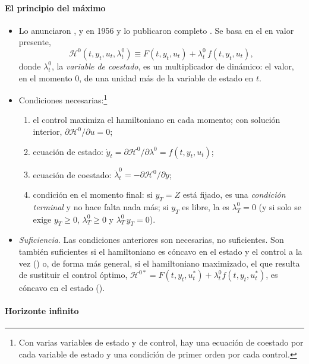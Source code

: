 \documentclass[11pt]{article}
\begin{document}
\paragraph{El principio del máximo}

\begin{itemize}
\item Lo anunciaron ,  y  en 1956 y lo publicaron completo \textcite{PontryaginEtAl1962}. Se basa en el  en valor presente,
  \begin{equation*}
  \mathcal{H}^0(t,y_t,u_t,\lambda^0_t)\equiv F(t,y_t,u_t)+\lambda^0_t\,f(t,y_t,u_t),
  \end{equation*}
  donde $\lambda^0_t$, la \emph{variable de coestado}, es un multiplicador de  dinámico: el valor, en el momento 0, de una unidad más de la variable de estado en $t$.
\item Condiciones necesarias:\footnote{Con varias variables de estado y de control, hay una ecuación de coestado por cada variable de estado y una condición de primer orden por cada control.}
  \begin{enumerate}
  \item el control maximiza el hamiltoniano en cada momento; con solución interior, $\partial\mathcal{H}^0/\partial u=0$;
  \item ecuación de estado: $\dot y_t=\partial\mathcal{H}^0/\partial\lambda^0=f(t,y_t,u_t)$;
  \item ecuación de coestado: $\dot\lambda^0_t=-\partial\mathcal{H}^0/\partial y$;
  \item condición en el momento final: si $y_T=Z$ está fijado, es una \emph{condición terminal} y no hace falta nada más; si $y_T$ es libre, la  es $\lambda^0_T=0$ (y si solo se exige $y_T\geq 0$, $\lambda^0_T\geq 0$ y $\lambda^0_T\,y_T=0$).
  \end{enumerate}
\item \emph{Suficiencia}. Las condiciones anteriores son necesarias, no suficientes. Son también suficientes si el hamiltoniano es cóncavo en el estado y el control a la vez () o, de forma más general, si el hamiltoniano maximizado, el que resulta de sustituir el control óptimo, $\mathcal{H}^{0*}=F(t,y_t,u^*_t)+\lambda^0_t f(t,y_t,u^*_t)$, es cóncavo en el estado ().
\end{itemize}

\paragraph{Horizonte infinito}
\end{document}
